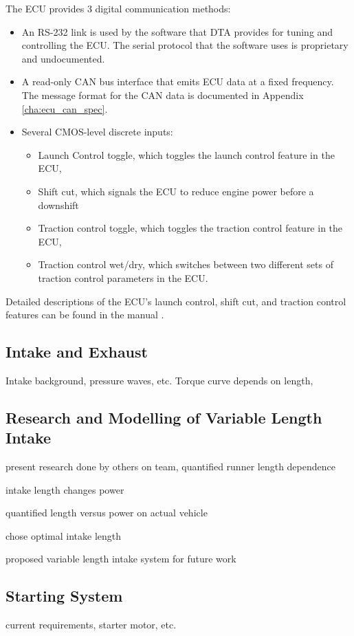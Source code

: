 The ECU provides 3 digital communication methods:
\begin{itemize}
  \item An RS-232 link is used by the software that DTA provides for tuning and controlling the ECU. The serial protocol that the software uses is proprietary and undocumented.
  \item A read-only CAN bus interface that emits ECU data at a fixed frequency. The message format for the CAN data is documented in Appendix \ref{cha:ecu_can_spec}.
  \item Several CMOS-level discrete inputs:
  \begin{itemize}
    \item Launch Control toggle, which toggles the launch control feature in the ECU,
    \item Shift cut, which signals the ECU to reduce engine power before a downshift
    \item Traction control toggle, which toggles the traction control feature in the ECU,
    \item Traction control wet/dry, which switches between two different sets of traction control parameters in the ECU.
  \end{itemize}
\end{itemize}

Detailed descriptions of the ECU's launch control, shift cut, and traction control features can be found in the manual \cite{s80pro}.
 

\subsection{Intake and Exhaust}

Intake background, pressure waves, etc. Torque curve depends on length, 

\subsection{Research and Modelling of Variable Length Intake}

present research done by others on team, quantified runner length
dependence

intake length changes power

quantified length versus power on actual vehicle

chose optimal intake length

proposed variable length intake system for future work

\subsection{Starting System}

current requirements, starter motor, etc.

